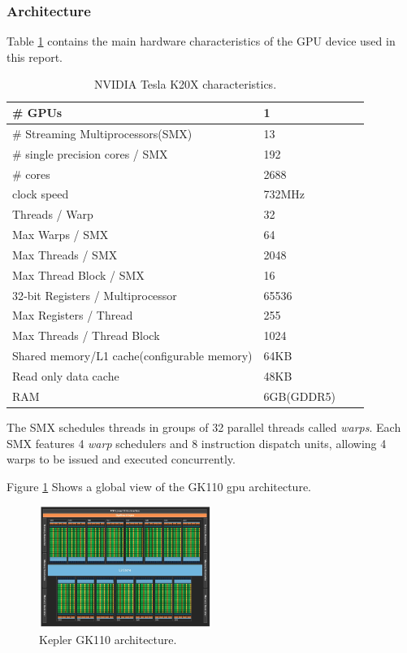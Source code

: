 \subsubsection{Architecture}

\par{Table \ref{tab:gpu_arch} contains the main hardware characteristics of the GPU device used in this report.}

\begin{table}[!h]
    \centering
    \begin{tabular}{| l | l | l | l |}
    \hline
    \# GPUs & 1 \\ \hline
    \# Streaming Multiprocessors(SMX) & 13 \\ \hline
    \# single precision cores / SMX & 192 \\ \hline
    \# cores & 2688 \\ \hline
    clock speed & 732MHz \\ \hline
    Threads / Warp & 32 \\ \hline
    Max Warps / SMX & 64 \\ \hline
    Max Threads / SMX & 2048 \\ \hline
    Max Thread Block / SMX & 16 \\ \hline
    32‐bit Registers / Multiprocessor & 65536 \\ \hline
    Max Registers / Thread & 255 \\ \hline
    Max Threads / Thread Block& 1024 \\ \hline
    Shared memory/L1 cache(configurable memory) & 64KB \\ \hline
    Read only data cache & 48KB \\ \hline
    RAM & 6GB(GDDR5) \\ \hline
    \end{tabular}
    \caption{NVIDIA Tesla K20X characteristics\cite{gpu_specs1}.}
    \label{tab:gpu_arch}
\end{table}

\par{The SMX schedules threads in groups of 32 parallel threads called \emph{warps}. Each SMX features 4 \emph{warp}
    schedulers and 8 instruction dispatch units, allowing 4 warps to be issued and executed concurrently\cite{gpu_specs1}.}

\par{Figure \ref{GpuArch} Shows a global view of the GK110 gpu architecture.}

\begin{figure}[!h]
    \centering
    \includegraphics[width=0.5\textwidth]{figures/gpu_arch.png}
    \caption{Kepler GK110 architecture\cite{gpu_specs1}.}
    \label{GpuArch}
\end{figure}

